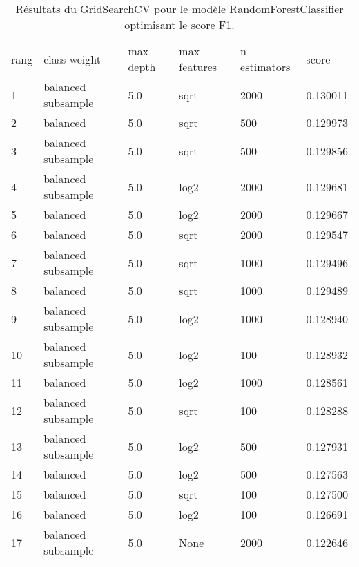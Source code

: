 \documentclass[
    iict, %
    il, %
]{heig-tb}
\begin{document}
\begin{table}[H]
    \begin{center}
        \caption{\label{grid_search_results}Résultats du GridSearchCV pour le modèle RandomForestClassifier optimisant le score F1.}
        \begin{tabular}{llllll}
            rang & class weight       & max depth & max features & n estimators & score    \\
            1    & balanced subsample & 5.0       & sqrt         & 2000         & 0.130011 \\
            2    & balanced           & 5.0       & sqrt         & 500          & 0.129973 \\
            3    & balanced subsample & 5.0       & sqrt         & 500          & 0.129856 \\
            4    & balanced subsample & 5.0       & log2         & 2000         & 0.129681 \\
            5    & balanced           & 5.0       & log2         & 2000         & 0.129667 \\
            6    & balanced           & 5.0       & sqrt         & 2000         & 0.129547 \\
            7    & balanced subsample & 5.0       & sqrt         & 1000         & 0.129496 \\
            8    & balanced           & 5.0       & sqrt         & 1000         & 0.129489 \\
            9    & balanced subsample & 5.0       & log2         & 1000         & 0.128940 \\
            10   & balanced subsample & 5.0       & log2         & 100          & 0.128932 \\
            11   & balanced           & 5.0       & log2         & 1000         & 0.128561 \\
            12   & balanced subsample & 5.0       & sqrt         & 100          & 0.128288 \\
            13   & balanced subsample & 5.0       & log2         & 500          & 0.127931 \\
            14   & balanced           & 5.0       & log2         & 500          & 0.127563 \\
            15   & balanced           & 5.0       & sqrt         & 100          & 0.127500 \\
            16   & balanced           & 5.0       & log2         & 100          & 0.126691 \\
            17   & balanced subsample & 5.0       & None         & 2000         & 0.122646 \\

\end{tabular}
\end{center}
\end{table}
\end{document}
